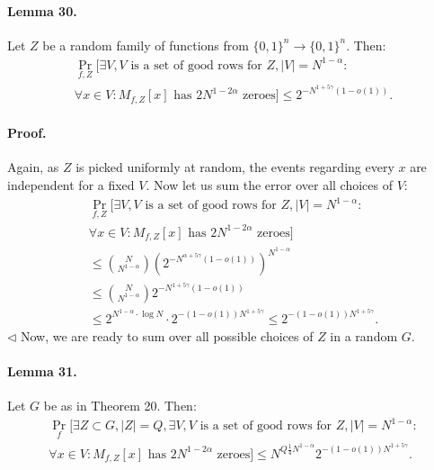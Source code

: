\paragraph{Lemma 30.} Let $Z$ be a random family of functions from $\{0,1\}^n\to\{0,1\}^n$. Then:
\begin{multline*}
\Pr_{f,Z}[\exists V,V\text{ is a set of good rows for }Z,|V|=N^{1-\alpha}:\\
\forall x\in V:M_{f,Z}[x]\text{ has }2N^{1-2\alpha}\text{ zeroes}]\leq2^{-N^{1+5\gamma}(1-o(1))}.
\end{multline*}
\paragraph{Proof.} Again, as $Z$ is picked uniformly at random, the events regarding every $x$ are independent for a fixed $V$. Now let us sum the error over all choices of $V$:
\begin{multline*}
\Pr_{f,Z}[\exists V,V\text{ is a set of good rows for }Z,|V|=N^{1-\alpha}:\\
\forall x\in V:M_{f,Z}[x]\text{ has }2N^{1-2\alpha}\text{ zeroes}]\\
\leq\binom N{N^{1-\alpha}}\left(2^{-N^{\alpha+5\gamma}(1-o(1))}\right)^{N^{1-\alpha}}\\
\leq\binom N{N^{1-\alpha}}2^{-N^{1+5\gamma}(1-o(1))}\\
\leq2^{N^{1-\alpha}\cdot\log N}\cdot2^{-(1-o(1))N^{1+5\gamma}}\leq2^{-(1-o(1))N^{1+5\gamma}}.
\end{multline*}\hfill$\triangleleft$
Now, we are ready to sum over all possible choices of $Z$ in a random $G$.
\paragraph{Lemma 31.} Let $G$ be as in Theorem 20. Then:
\begin{multline*}
\Pr_f[\exists Z\subset G,|Z|=Q,\exists V,V\text{ is a set of good rows for }Z,|V|=N^{1-\alpha}:\\
\forall x\in V:M_{f,Z}[x]\text{ has }2N^{1-2\alpha}\text{ zeroes}]\leq N^{Q\frac14N^{1-\alpha}}2^{-(1-o(1))N^{1+5\gamma}}.
\end{multline*}
